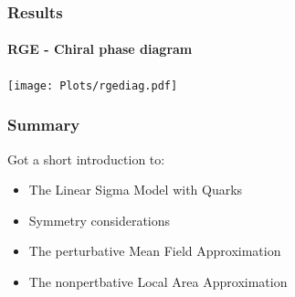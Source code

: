 \documentclass[10pt,a4paper,usenames,dvipsnames]{beamer}
\begin{document}
\begin{frame}
  \frametitle{Results}
  \framesubtitle{RGE - Chiral phase diagram}

  {\centering
    \texttt{[image: Plots/rgediag.pdf]}
   \par}
\end{frame}

\begin{frame}
  \frametitle{Summary}

  Got a short introduction to:
  \begin{itemize}
    \item The Linear Sigma Model with Quarks
    \item Symmetry considerations
    \item The perturbative Mean Field Approximation
    \item The nonpertbative Local Area Approximation
  \end{itemize}

\end{frame}
\end{document}
